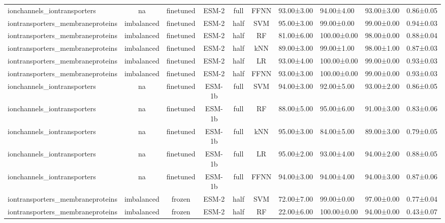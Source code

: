 \begin{tabular}{lcccccc}
     ionchannels\_iontransporters &         na &      finetuned &        ESM-2 &      full &       FFNN &  93.00±3.00 &  94.00±4.00 &  93.00±3.00 & 0.86±0.05 \\
iontransporters\_membraneproteins & imbalanced &      finetuned &        ESM-2 &      half &        SVM &  95.00±3.00 &  99.00±0.00 &  99.00±0.00 & 0.94±0.03 \\
iontransporters\_membraneproteins & imbalanced &      finetuned &        ESM-2 &      half &         RF &  81.00±6.00 & 100.00±0.00 &  98.00±0.00 & 0.88±0.04 \\
iontransporters\_membraneproteins & imbalanced &      finetuned &        ESM-2 &      half &        kNN &  89.00±3.00 &  99.00±1.00 &  98.00±1.00 & 0.87±0.03 \\
iontransporters\_membraneproteins & imbalanced &      finetuned &        ESM-2 &      half &         LR &  93.00±4.00 & 100.00±0.00 &  99.00±0.00 & 0.93±0.03 \\
iontransporters\_membraneproteins & imbalanced &      finetuned &        ESM-2 &      half &       FFNN &  93.00±3.00 & 100.00±0.00 &  99.00±0.00 & 0.93±0.03 \\
     ionchannels\_iontransporters &         na &      finetuned &       ESM-1b &      full &        SVM &  94.00±3.00 &  92.00±5.00 &  93.00±2.00 & 0.86±0.05 \\
     ionchannels\_iontransporters &         na &      finetuned &       ESM-1b &      full &         RF &  88.00±5.00 &  95.00±6.00 &  91.00±3.00 & 0.83±0.06 \\
     ionchannels\_iontransporters &         na &      finetuned &       ESM-1b &      full &        kNN &  95.00±3.00 &  84.00±5.00 &  89.00±3.00 & 0.79±0.05 \\
     ionchannels\_iontransporters &         na &      finetuned &       ESM-1b &      full &         LR &  95.00±2.00 &  93.00±4.00 &  94.00±2.00 & 0.88±0.05 \\
     ionchannels\_iontransporters &         na &      finetuned &       ESM-1b &      full &       FFNN &  94.00±3.00 &  94.00±4.00 &  94.00±3.00 & 0.87±0.06 \\
iontransporters\_membraneproteins & imbalanced &         frozen &        ESM-2 &      half &        SVM &  72.00±7.00 &  99.00±0.00 &  97.00±0.00 & 0.77±0.04 \\
iontransporters\_membraneproteins & imbalanced &         frozen &        ESM-2 &      half &         RF &  22.00±6.00 & 100.00±0.00 &  94.00±0.00 & 0.43±0.07 \\

\end{tabular}
